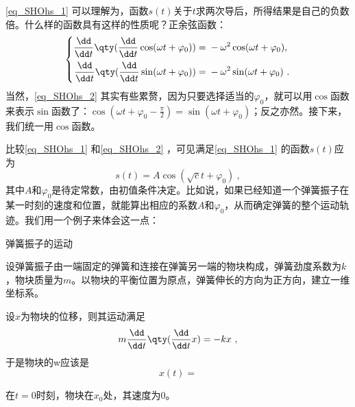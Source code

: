 \autoref{eq_SHOhs_1} 可以理解为，函数$s(t)$关于$t$求两次导后，所得结果是自己的负数倍。什么样的函数具有这样的性质呢？正余弦函数：
\begin{equation}\label{eq_SHOhs_2}
\left\{
\begin{aligned}
    \frac{\dd}{\dd t}\qty(\frac{\dd}{\dd t}\cos(\omega t+\varphi_0)) ={}& -\omega^2\cos(\omega t+\varphi_0), \\
    \frac{\dd}{\dd t}\qty(\frac{\dd}{\dd t}\sin(\omega t+\varphi_0)) ={}& -\omega^2\sin(\omega t+\varphi_0)~. 
\end{aligned}
\right. 
\end{equation}
当然，\autoref{eq_SHOhs_2} 其实有些累赘，因为只要选择适当的$\varphi_0$，就可以用$\cos$函数来表示$\sin$函数了：$\cos(\omega t+\varphi_0-\frac{\pi}{2})=\sin(\omega t+\varphi_0)$；反之亦然。接下来，我们统一用$\cos$函数。

比较\autoref{eq_SHOhs_1} 和\autoref{eq_SHOhs_2} ，可见满足\autoref{eq_SHOhs_1} 的函数$s(t)$应为
\begin{equation}
s(t) = A\cos(\sqrt{c}t+\varphi_0)~,  
\end{equation}
其中$A$和$\varphi_0$是待定常数，由初值条件决定。比如说，如果已经知道一个弹簧振子在某一时刻的速度和位置，就能算出相应的系数$A$和$\varphi_0$，从而确定弹簧的整个运动轨迹。我们用一个例子来体会这一点：



\begin{example}{弹簧振子的运动}

设弹簧振子由一端固定的弹簧和连接在弹簧另一端的物块构成，弹簧劲度系数为$k$，物块质量为$m$。以物块的平衡位置为原点，弹簧伸长的方向为正方向，建立一维坐标系。

设$x$为物块的位移，则其运动满足
\begin{equation}
m\frac{\dd}{\dd t}\qty(\frac{\dd}{\dd t}x) = -kx~, 
\end{equation}
于是物块的w应该是
\begin{equation}
x(t) = 
\end{equation}

在$t=0$时刻，物块在$x_0$处，其速度为$0$。

\end{example}


























